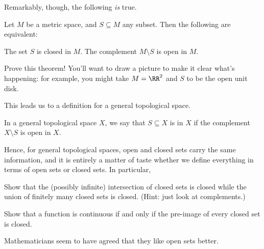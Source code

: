Remarkably, though, the following \emph{is} true.
\begin{theorem}
	Let $M$ be a metric space, and $S \subseteq M$ any subset.
	Then the following are equivalent:
	\begin{itemize}
		\ii The set $S$ is closed in $M$.
		\ii The complement $M \setminus S$ is open in $M$.
	\end{itemize}
\end{theorem}
\begin{exercise}
	Prove this theorem!
	You'll want to draw a picture to make it clear what's happening: for example,
	you might take $M = \RR^2$ and $S$ to be the open unit disk.
\end{exercise}

This leads us to a definition for a general topological space.
\begin{definition}
	In a general topological space $X$, we say that $S \subseteq X$ is
	 in $X$ if the complement $X \setminus S$ is open in $X$.
\end{definition}
Hence, for general topological spaces, open and closed sets carry the same information,
and it is entirely a matter of taste whether we define everything in terms
of open sets or closed sets.
In particular,
\begin{ques}
	Show that the (possibly infinite) intersection of closed sets is closed
	while the union of finitely many closed sets is closed.
	(Hint: just look at complements.)
\end{ques}
\begin{ques}
	Show that a function is continuous if and only if the pre-image
	of every closed set is closed.
\end{ques}
Mathematicians seem to have agreed that they like open sets better.

